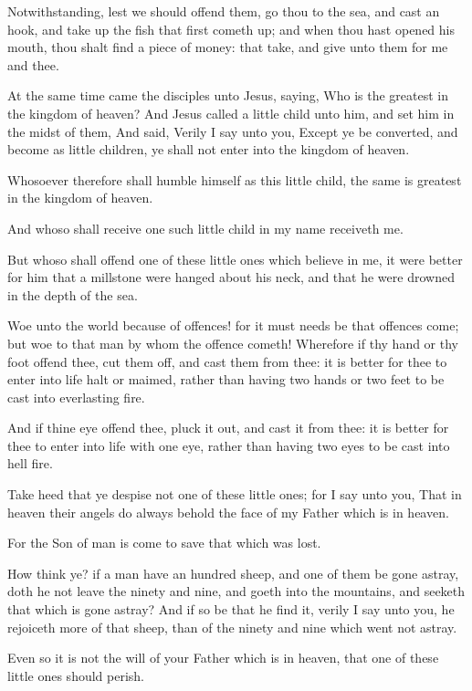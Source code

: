 \Verse Notwithstanding, lest we should offend them, go thou to the sea, and cast an hook, and take up the fish that first cometh up; and when thou hast opened his mouth, thou shalt find a piece of money: that take, and give unto them for me and thee.


\Chapter
\Verse At the same time came the disciples unto Jesus, saying, Who is the greatest in the kingdom of heaven?  \Verse And Jesus called a little child unto him, and set him in the midst of them, \Verse And said, Verily I say unto you, Except ye be converted, and become as little children, ye shall not enter into the kingdom of heaven.

\Verse Whosoever therefore shall humble himself as this little child, the same is greatest in the kingdom of heaven.

\Verse And whoso shall receive one such little child in my name receiveth me.

\Verse But whoso shall offend one of these little ones which believe in me, it were better for him that a millstone were hanged about his neck, and that he were drowned in the depth of the sea.

\Verse Woe unto the world because of offences! for it must needs be that offences come; but woe to that man by whom the offence cometh!  \Verse Wherefore if thy hand or thy foot offend thee, cut them off, and cast them from thee: it is better for thee to enter into life halt or maimed, rather than having two hands or two feet to be cast into everlasting fire.

\Verse And if thine eye offend thee, pluck it out, and cast it from thee: it is better for thee to enter into life with one eye, rather than having two eyes to be cast into hell fire.

\Verse Take heed that ye despise not one of these little ones; for I say unto you, That in heaven their angels do always behold the face of my Father which is in heaven.

\Verse For the Son of man is come to save that which was lost.

\Verse How think ye? if a man have an hundred sheep, and one of them be gone astray, doth he not leave the ninety and nine, and goeth into the mountains, and seeketh that which is gone astray?  \Verse And if so be that he find it, verily I say unto you, he rejoiceth more of that sheep, than of the ninety and nine which went not astray.

\Verse Even so it is not the will of your Father which is in heaven, that one of these little ones should perish.

